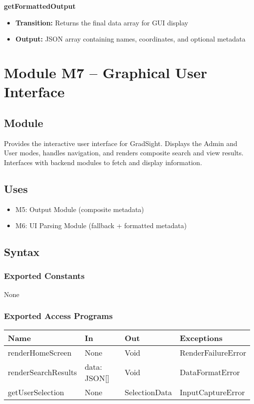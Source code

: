 \documentclass[12pt, titlepage]{article}
\begin{document}
\textbf{getFormattedOutput}
\begin{itemize}
  \item \textbf{Transition:} Returns the final data array for GUI display  
  \item \textbf{Output:} JSON array containing names, coordinates, and optional metadata
\end{itemize}



\section{Module M7 – Graphical User Interface}
\label{SecM7}

\subsection*{Module}

Provides the interactive user interface for GradSight. Displays the Admin and User modes, handles navigation, and renders composite search and view results. Interfaces with backend modules to fetch and display information.

\subsection*{Uses}

\begin{itemize}
  \item M5: Output Module (composite metadata)
  \item M6: UI Parsing Module (fallback + formatted metadata)
\end{itemize}

\subsection*{Syntax}

\subsubsection*{Exported Constants}

None

\subsubsection*{Exported Access Programs}

\begin{center}
\begin{tabular}{|p{3.5cm} | p{3.5cm} | p{3.5cm} | p{3.5cm}|}
\hline
\textbf{Name} & \textbf{In} & \textbf{Out} & \textbf{Exceptions} \\
\hline
renderHomeScreen & None & Void & RenderFailureError \\
renderSearchResults & data: JSON[] & Void & DataFormatError \\
getUserSelection & None & SelectionData & InputCaptureError \\
\hline
\end{tabular}
\end{center}
\end{document}

